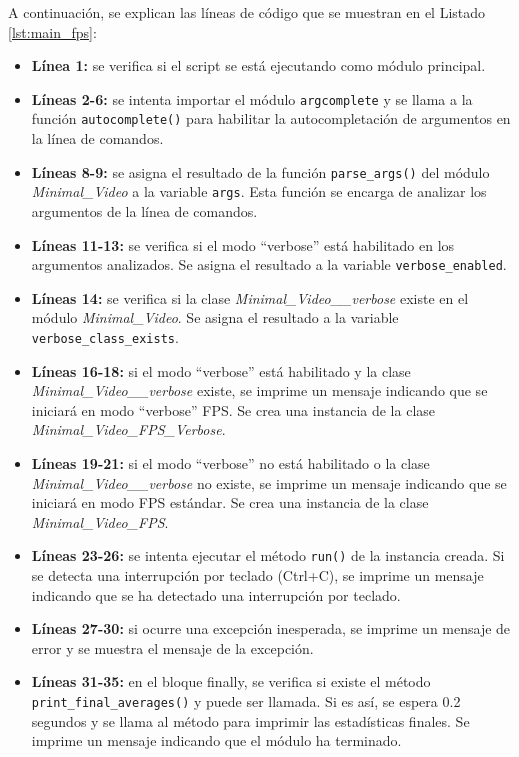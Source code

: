 A continuación, se explican las líneas de código que se muestran en el Listado \ref{lst:main_fps}:
\begin{itemize}
    \item \textbf{Línea 1:} se verifica si el script se está ejecutando como módulo principal.
    \item \textbf{Líneas 2-6:} se intenta importar el módulo \texttt{argcomplete} y se llama a la función \texttt{autocomplete()} para habilitar la autocompletación de argumentos en la línea de comandos.
    \item \textbf{Líneas 8-9:} se asigna el resultado de la función \texttt{parse\_args()} del módulo \textit{Minimal\_Video} a la variable \texttt{args}. Esta función se encarga de analizar los argumentos de la línea de comandos.
    \item \textbf{Líneas 11-13:} se verifica si el modo ``verbose'' está habilitado en los argumentos analizados. Se asigna el resultado a la variable \texttt{verbose\_enabled}.
    \item \textbf{Líneas 14:} se verifica si la clase \textit{Minimal\_Video\_\_verbose} existe en el módulo \textit{Minimal\_Video}. Se asigna el resultado a la variable \texttt{verbose\_class\_exists}.
    \item \textbf{Líneas 16-18:} si el modo ``verbose'' está habilitado y la clase \textit{Minimal\_Video\_\_verbose} existe, se imprime un mensaje indicando que se iniciará en modo ``verbose'' FPS. Se crea una instancia de la clase \textit{Minimal\_Video\_FPS\_Verbose}.
    \item \textbf{Líneas 19-21:} si el modo ``verbose'' no está habilitado o la clase \textit{Minimal\_Video\_\_verbose} no existe, se imprime un mensaje indicando que se iniciará en modo FPS estándar. Se crea una instancia de la clase \textit{Minimal\_Video\_FPS}.
    \item \textbf{Líneas 23-26:} se intenta ejecutar el método \texttt{run()} de la instancia creada. Si se detecta una interrupción por teclado (Ctrl+C), se imprime un mensaje indicando que se ha detectado una interrupción por teclado.
    \item \textbf{Líneas 27-30:} si ocurre una excepción inesperada, se imprime un mensaje de error y se muestra el mensaje de la excepción.
    \item \textbf{Líneas 31-35:} en el bloque finally, se verifica si existe el método \texttt{print\_final\_averages()} y puede ser llamada. Si es así, se espera 0.2 segundos y se llama al método para imprimir las estadísticas finales. Se imprime un mensaje indicando que el módulo ha terminado.
\end{itemize}
\vspace{\baselineskip}

